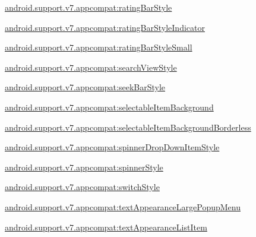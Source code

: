 {\ttfamily \hyperlink{classandroid_1_1support_1_1v7_1_1appcompat_1_1R_1_1styleable_a3252c016d788ccf2df296402f41db160}{android.\+support.\+v7.\+appcompat\+:rating\+Bar\+Style}}

{\ttfamily \hyperlink{classandroid_1_1support_1_1v7_1_1appcompat_1_1R_1_1styleable_a41bbe74341c8a14fa0aee8d6ae300f08}{android.\+support.\+v7.\+appcompat\+:rating\+Bar\+Style\+Indicator}}

{\ttfamily \hyperlink{classandroid_1_1support_1_1v7_1_1appcompat_1_1R_1_1styleable_a3d5d0c2c3772e2f0c3548e65cffca34f}{android.\+support.\+v7.\+appcompat\+:rating\+Bar\+Style\+Small}}

{\ttfamily \hyperlink{classandroid_1_1support_1_1v7_1_1appcompat_1_1R_1_1styleable_a0dd40ca8d5fe4531e45a7f4d0c4cc276}{android.\+support.\+v7.\+appcompat\+:search\+View\+Style}}

{\ttfamily \hyperlink{classandroid_1_1support_1_1v7_1_1appcompat_1_1R_1_1styleable_a082b50a47359f28a983cbc03e6d51289}{android.\+support.\+v7.\+appcompat\+:seek\+Bar\+Style}}

{\ttfamily \hyperlink{classandroid_1_1support_1_1v7_1_1appcompat_1_1R_1_1styleable_ad19a8df967ad91c672478f779be959c7}{android.\+support.\+v7.\+appcompat\+:selectable\+Item\+Background}}

{\ttfamily \hyperlink{classandroid_1_1support_1_1v7_1_1appcompat_1_1R_1_1styleable_a6b4e748fcf3ab58f9a756773bb3bf432}{android.\+support.\+v7.\+appcompat\+:selectable\+Item\+Background\+Borderless}}

{\ttfamily \hyperlink{classandroid_1_1support_1_1v7_1_1appcompat_1_1R_1_1styleable_abcc5a46cb6b46deb459f96b4b614a633}{android.\+support.\+v7.\+appcompat\+:spinner\+Drop\+Down\+Item\+Style}}

{\ttfamily \hyperlink{classandroid_1_1support_1_1v7_1_1appcompat_1_1R_1_1styleable_a479f2661585bab71f0ceb0c86482f40d}{android.\+support.\+v7.\+appcompat\+:spinner\+Style}}

{\ttfamily \hyperlink{classandroid_1_1support_1_1v7_1_1appcompat_1_1R_1_1styleable_a57e1f510b55a34ce46089f5c131a9d99}{android.\+support.\+v7.\+appcompat\+:switch\+Style}}

{\ttfamily \hyperlink{classandroid_1_1support_1_1v7_1_1appcompat_1_1R_1_1styleable_a8ecc7b52c9caba35359833cfc27874d8}{android.\+support.\+v7.\+appcompat\+:text\+Appearance\+Large\+Popup\+Menu}}

{\ttfamily \hyperlink{classandroid_1_1support_1_1v7_1_1appcompat_1_1R_1_1styleable_a59547599ad3f87d998f6508204f27aa1}{android.\+support.\+v7.\+appcompat\+:text\+Appearance\+List\+Item}}

